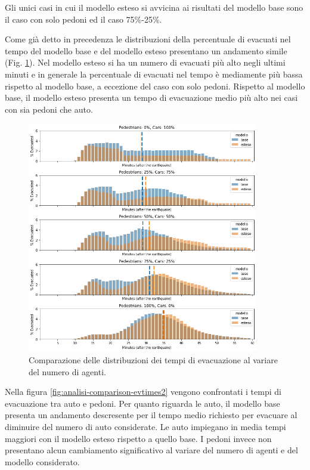 Gli unici casi in cui il modello esteso si avvicina ai risultati del modello base sono il caso con solo pedoni ed il caso 75\%-25\%.

\pagebreak

Come già detto in precedenza le distribuzioni della percentuale di evacuati nel tempo del modello base e del modello esteso 
presentano un andamento simile (Fig. \ref{fig:analisi-comparison-evtimes}).
%
Nel modello esteso si ha un numero di evacuati più alto negli ultimi minuti e 
in generale la percentuale di evacuati nel tempo è mediamente più bassa rispetto al modello base, a eccezione del caso con solo pedoni.
%
Rispetto al modello base, il modello esteso presenta un tempo di evacuazione medio più alto nei casi con sia pedoni che auto.

\begin{figure}[ht]
    \centering
    \includegraphics[width=0.9\textwidth]{images/analisi/comparison-evtimes.png}
    \caption{Comparazione delle distribuzioni dei tempi di evacuazione al variare del numero di agenti.}
    \label{fig:analisi-comparison-evtimes}
\end{figure}

\pagebreak

Nella figura \ref{fig:analisi-comparison-evtimes2} vengono confrontati i tempi di evacuazione tra auto e pedoni.
Per quanto riguarda le auto, il modello base presenta un andamento descresente per il tempo medio richiesto per evacuare al diminuire del numero di auto considerate.
Le auto impiegano in media tempi maggiori con il modello esteso rispetto a quello base.
%
I pedoni invece non presentano alcun cambiamento significativo al variare del numero di agenti e del modello considerato. 

